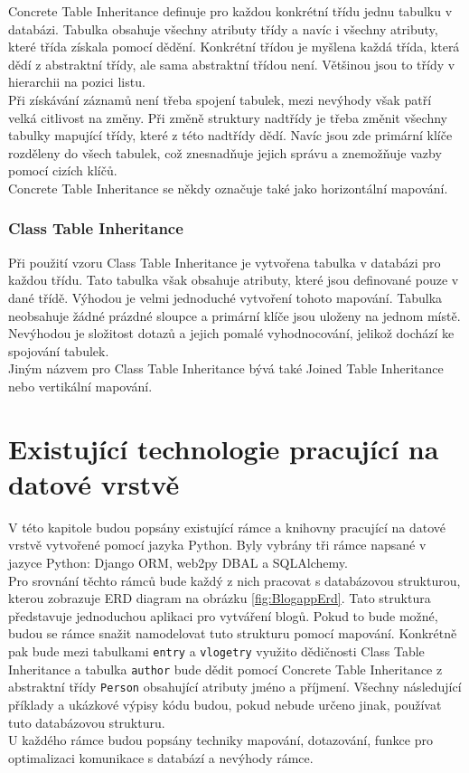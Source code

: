 \documentclass[ing,male,java,dept456]{diploma}						%
\begin{document}
Concrete Table Inheritance definuje pro každou konkrétní třídu jednu tabulku v databázi. Tabulka obsahuje všechny atributy třídy a navíc i všechny atributy, které třída získala pomocí dědění. Konkrétní třídou je myšlena každá třída, která dědí z abstraktní třídy, ale sama abstraktní třídou není. Většinou jsou to třídy v hierarchii na pozici listu. \\
Při získávání záznamů není třeba spojení tabulek, mezi nevýhody však patří velká citlivost na změny. Při změně struktury nadtřídy je třeba změnit všechny tabulky mapující třídy, které z této nadtřídy dědí. Navíc jsou zde primární klíče rozděleny do všech tabulek, což znesnadňuje jejich správu a znemožňuje vazby pomocí cizích klíčů. \\
Concrete Table Inheritance se někdy označuje také jako horizontální mapování.

\subsubsection{Class Table Inheritance}

Při použití vzoru Class Table Inheritance je vytvořena tabulka v databázi pro každou třídu. Tato tabulka však obsahuje atributy, které jsou definované pouze v dané třídě. Výhodou je velmi jednoduché vytvoření tohoto mapování. Tabulka neobsahuje žádné prázdné sloupce a primární klíče jsou uloženy na jednom místě. Nevýhodou je složitost dotazů a jejich pomalé vyhodnocování, jelikož dochází ke spojování tabulek.  \\
Jiným názvem pro Class Table Inheritance bývá také Joined Table Inheritance nebo vertikální mapování.

\section{Existující technologie pracující na datové vrstvě}
\label{sec:Comparison}

V této kapitole budou popsány existující rámce a knihovny pracující na datové vrstvě vytvořené pomocí jazyka Python. Byly vybrány tři rámce napsané v jazyce Python: Django ORM, web2py DBAL a SQLAlchemy. \\
Pro srovnání těchto rámců bude každý z nich pracovat s databázovou strukturou, kterou zobrazuje ERD diagram na obrázku \ref{fig:BlogappErd}. Tato struktura představuje jednoduchou aplikaci pro vytváření blogů. Pokud to bude možné, budou se rámce snažit namodelovat tuto strukturu pomocí mapování. Konkrétně pak bude mezi tabulkami \lstinline[style=inlinepython]|entry| a \lstinline[style=inlinepython]|vlogetry| využito dědičnosti Class Table Inheritance a tabulka \lstinline[style=inlinepython]|author| bude dědit pomocí Concrete Table Inheritance z abstraktní třídy \lstinline[style=inlinepython]|Person| obsahující atributy jméno a příjmení. Všechny následující příklady a ukázkové výpisy kódu budou, pokud nebude určeno jinak, používat tuto databázovou strukturu. \\
U každého rámce budou popsány techniky mapování, dotazování, funkce pro optimalizaci komunikace s databází a nevýhody rámce.
\end{document}
